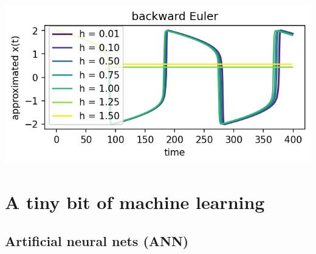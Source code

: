 \documentclass[12pt,letterpaper,noanswers]{exam}
\newcommand{\vc}[1]{\boldsymbol{#1}}
\begin{document}
\includegraphics{AM111-F23-CourseNotes/img/C22-bck.png}


\section*{A tiny bit of machine learning}






\subsection*{Artificial neural nets (ANN)}



\end{document}
